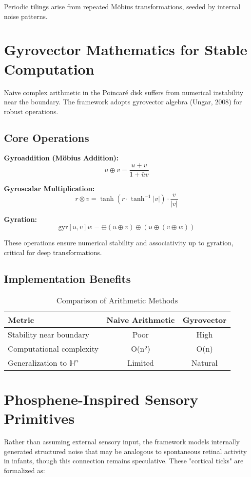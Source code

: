 \documentclass[10pt]{article}
\begin{document}
Periodic tilings arise from repeated Möbius transformations, seeded by internal noise patterns.

\section{Gyrovector Mathematics for Stable Computation}

Naive complex arithmetic in the Poincaré disk suffers from numerical instability near the boundary. The framework adopts gyrovector algebra (Ungar, 2008) for robust operations.

\subsection{Core Operations}

\textbf{Gyroaddition (Möbius Addition):}
$$u \oplus v = \frac{u + v}{1 + \bar{u}v}$$

\textbf{Gyroscalar Multiplication:}
$$r \otimes v = \tanh(r \cdot \tanh^{-1}|v|) \cdot \frac{v}{|v|}$$

\textbf{Gyration:}
$$\text{gyr}[u,v]w = \ominus(u \oplus v) \oplus (u \oplus (v \oplus w))$$

These operations ensure numerical stability and associativity up to gyration, critical for deep transformations.

\subsection{Implementation Benefits}

\begin{table}[H]
\centering
\caption{Comparison of Arithmetic Methods}
\begin{tabular}{lcc}
\toprule
Metric & Naive Arithmetic & Gyrovector \\
\midrule
Stability near boundary & Poor & High \\
Computational complexity & O(n²) & O(n) \\
Generalization to $\mathbb{H}^n$ & Limited & Natural \\
\bottomrule
\end{tabular}
\end{table}

\section{Phosphene-Inspired Sensory Primitives}

Rather than assuming external sensory input, the framework models internally generated structured noise that may be analogous to spontaneous retinal activity in infants, though this connection remains speculative. These "cortical ticks" are formalized as:
\end{document}
